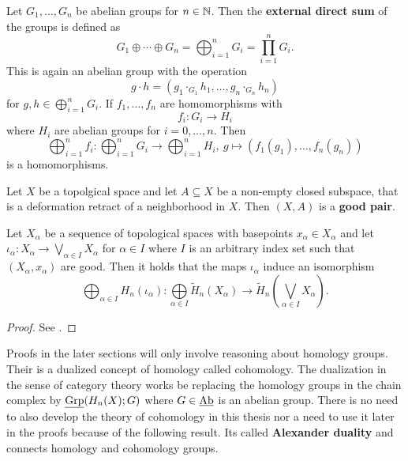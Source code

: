 \begin{defin}
  Let $G_1, \ldots, G_n$ be abelian groups for $n \in \mathbb{N}$. Then the \textbf{external direct sum} of the groups is defined as
  \begin{equation*}
    G_1 \oplus \cdots \oplus G_n = \bigoplus_{i=1}^n G_i = \prod_{i=1}^n G_i.
  \end{equation*}
  This is again an abelian group with the operation \[g \cdot h = (g_1 \cdot_{G_1} h_1, \ldots, g_n \cdot_{G_n} h_n)\] for $g,h \in \bigoplus_{i=1}^n G_i$.
  If $f_1, \ldots, f_n$ are homomorphisms with \[f_i\colon G_i \to H_i\] where $H_i$ are abelian groups for $i = 0,\ldots,n$. Then
  \begin{equation*}
    \bigoplus_{i=1}^nf_i\colon \bigoplus_{i=1}^n G_i\to \bigoplus_{i=1}^nH_i,\: g \mapsto (f_1(g_1),\ldots, f_n(g_n))
  \end{equation*}
  is a homomorphisms.
\end{defin}

\begin{defin}
  Let $X$ be a topolgical space and let $A \subseteq X$ be a non-empty closed subspace, that is a deformation retract of a neighborhood in $X$. Then $(X, A)$ is a \textbf{good pair}.
\end{defin}

\begin{lemma}\label{lem:holwe}
  Let $X_\alpha$ be a sequence of topological spaces with basepoints $x_\alpha\in X_\alpha$ and let $\iota_\alpha\colon X_\alpha \to \bigvee\limits_{\alpha \in I}X_\alpha$ for $\alpha \in I$ where $I$ is an arbitrary index set such that $(X_\alpha, x_\alpha)$ are good. Then it holds that the maps $\iota_\alpha$ induce an isomorphism
  \begin{equation*}
    \bigoplus_{\alpha \in I}H_n(\iota_\alpha) \colon \bigoplus\limits_{\alpha\in I} \tilde{H}_n(X_\alpha)\to \tilde{H}_n\left(\bigvee\limits_{\alpha\in I} X_\alpha\right).
  \end{equation*}
\end{lemma}

\begin{proof}
  See \cite[Corollary 2.25]{hatcher}.
\end{proof}

Proofs in the later sections will only involve reasoning about homology groups. Their is a dualized concept of homology called cohomology.
The dualization in the sense of category theory works be replacing the homology groups in the chain complex by $\underline{\rm Grp}(H_n(X); G)$ where $G \in \underline{\rm Ab}$ is an abelian group. There is no need to also develop the theory of cohomology in this thesis nor a need to use it later in the proofs because of the following result. Its called \textbf{Alexander duality} and connects homology and cohomology groups.

